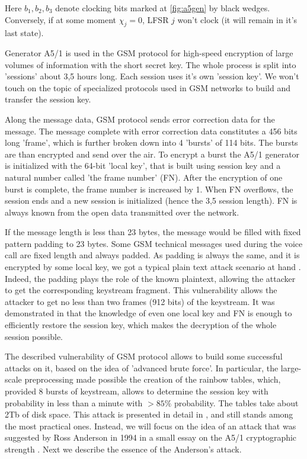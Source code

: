 \documentclass[runningheads,a4paper]{llncs}[2015/06/24]
\begin{document}
Here $b_1,b_2,b_3$ denote clocking bits marked at \cref{fig:a5gen} by black
wedges. Conversely, if at some moment $\chi_j=0$, LFSR $j$ won't clock (it will
remain in it's last state).

Generator A5/1 is used in the GSM protocol for high-speed encryption of large
volumes of information with the short secret key. The whole process is split
into 'sessions' about 3,5 hours long. Each session uses it's own 'session key'.
We won't touch on the topic of specialized protocols used in GSM networks to
build and transfer the session key.

Along the message data, GSM protocol sends error correction data for the
message. The message complete with error correction data constitutes a 456 bits
long 'frame', which is further broken down into 4 'bursts' of 114 bits. The
bursts are than encrypted and send over the air. To encrypt a burst the A5/1
generator is initialized with the 64-bit 'local key', that is built using
session key and a natural number called 'the frame number' (FN). After the
encryption of one burst is complete, the frame number is increased by 1. When
FN overflows, the session ends and a new session is initialized (hence the 3,5
session length). FN is always known from the open data transmitted over the
network. 

If the message length is less than 23 bytes, the message would be filled with
fixed pattern padding to 23 bytes. Some GSM technical messages used during the
voice call are fixed length and always padded. As padding is always the same,
and it is encrypted by some local key, we got a typical plain text attack
scenario at hand \cite{MENEZES}. Indeed, the padding plays the role of the
known plaintext, allowing the attacker to get the corresponding keystream
fragment. This vulnerability allows the attacker to get no less than two frames
(912 bits) of the keystream. It was demonstrated in \cite{UNKN1} that the
knowledge of even one local key and FN is enough to efficiently restore the
session key, which makes the decryption of the whole session possible.


The described vulnerability of GSM protocol allows to build some successful
attacks on it, based on the idea of 'advanced brute force'. In particular, the
large-scale preprocessing made possible the creation of the rainbow tables,
which, provided 8 bursts of keystream, allows to determine the session key with
probability in less than a minute with $>85\%$ probability. The tables take
about 2Tb of disk space. This attack is presented in detail in \cite{RAINBOW},
and still stands among the most practical ones. Instead, we will focus on the
idea of an attack that was suggested by Ross Anderson in 1994 in a small essay
on the A5/1 cryptographic strength \cite{COPAC}. Next we describe the essence
of the Anderson's attack.
\end{document}
